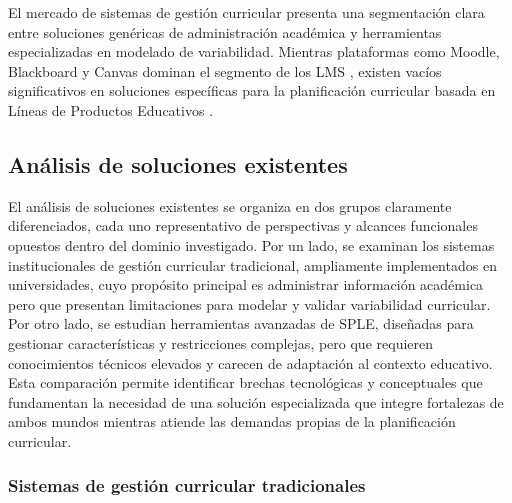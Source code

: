 El mercado de sistemas de gestión curricular presenta una segmentación clara
entre soluciones genéricas de administración académica y herramientas
especializadas en modelado de variabilidad. Mientras plataformas como
Moodle, Blackboard y Canvas dominan el segmento de los \ac{LMS} 
\citep{moodle2025overview, blackboard2025overview, canvas2025overview},
existen vacíos significativos en soluciones específicas para la
planificación curricular basada en Líneas de Productos Educativos 
\citep{sanchez2020metodologia}.
    
\subsection{Análisis de soluciones existentes}

El análisis de soluciones existentes se organiza en dos grupos claramente 
diferenciados, cada uno representativo de perspectivas y alcances funcionales 
opuestos dentro del dominio investigado. Por un lado, se examinan los sistemas 
institucionales de gestión curricular tradicional, ampliamente implementados 
en universidades, cuyo propósito principal es administrar información académica 
pero que presentan limitaciones para modelar y validar variabilidad curricular. 
Por otro lado, se estudian herramientas avanzadas de \ac{SPLE}, diseñadas para gestionar características y 
restricciones complejas, pero que requieren conocimientos técnicos elevados y 
carecen de adaptación al contexto educativo. Esta comparación permite identificar 
brechas tecnológicas y conceptuales que fundamentan la necesidad de una solución 
especializada que integre fortalezas de ambos mundos mientras atiende las demandas 
propias de la planificación curricular.
        
\subsubsection{Sistemas de gestión curricular tradicionales}

